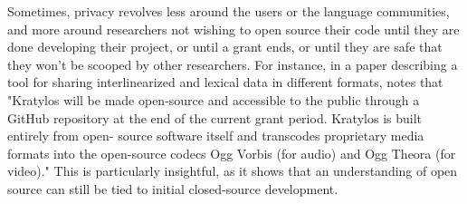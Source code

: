 %
%

Sometimes, privacy revolves less around the users or the language communities, and more around researchers not wishing to open source their code until they are done developing their project, or until a grant ends, or until they are safe that they won't be scooped by other researchers. For instance, in a paper describing a tool for sharing interlinearized and lexical data in different formats, \citet{kaufman2018kratylos} notes that "Kratylos will be made open-source and accessible to the public through a GitHub repository at the end of the current grant period. Kratylos is built entirely from open- source software itself and transcodes proprietary media formats into the open-source codecs Ogg Vorbis (for audio) and Ogg Theora (for video)." This is particularly insightful, as it shows that an understanding of open source can still be tied to initial closed-source development. %

